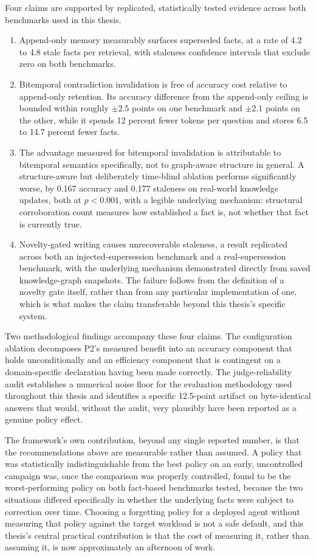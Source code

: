 Four claims are supported by replicated, statistically tested evidence across both benchmarks used in this thesis.

\begin{enumerate}
\item Append-only memory measurably surfaces superseded facts, at a rate of 4.2 to 4.8 stale facts per retrieval, with staleness confidence intervals that exclude zero on both benchmarks.
\item Bitemporal contradiction invalidation is free of accuracy cost relative to append-only retention. Its accuracy difference from the append-only ceiling is bounded within roughly $\pm 2.5$ points on one benchmark and $\pm 2.1$ points on the other, while it spends 12 percent fewer tokens per question and stores 6.5 to 14.7 percent fewer facts.
\item The advantage measured for bitemporal invalidation is attributable to bitemporal semantics specifically, not to graph-aware structure in general. A structure-aware but deliberately time-blind ablation performs significantly worse, by 0.167 accuracy and 0.177 staleness on real-world knowledge updates, both at $p < 0.001$, with a legible underlying mechanism: structural corroboration count measures how established a fact is, not whether that fact is currently true.
\item Novelty-gated writing causes unrecoverable staleness, a result replicated across both an injected-supersession benchmark and a real-supersession benchmark, with the underlying mechanism demonstrated directly from saved knowledge-graph snapshots. The failure follows from the definition of a novelty gate itself, rather than from any particular implementation of one, which is what makes the claim transferable beyond this thesis's specific system.
\end{enumerate}

Two methodological findings accompany these four claims. The configuration ablation decomposes P2's measured benefit into an accuracy component that holds unconditionally and an efficiency component that is contingent on a domain-specific declaration having been made correctly. The judge-reliability audit establishes a numerical noise floor for the evaluation methodology used throughout this thesis and identifies a specific 12.5-point artifact on byte-identical answers that would, without the audit, very plausibly have been reported as a genuine policy effect.

The framework's own contribution, beyond any single reported number, is that the recommendations above are measurable rather than assumed. A policy that was statistically indistinguishable from the best policy on an early, uncontrolled campaign was, once the comparison was properly controlled, found to be the worst-performing policy on both fact-based benchmarks tested, because the two situations differed specifically in whether the underlying facts were subject to correction over time. Choosing a forgetting policy for a deployed agent without measuring that policy against the target workload is not a safe default, and this thesis's central practical contribution is that the cost of measuring it, rather than assuming it, is now approximately an afternoon of work.
